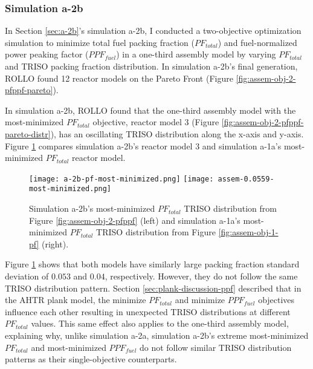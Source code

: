 \subsubsection{Simulation a-2b}
In Section \ref{sec:a-2b}'s simulation a-2b, I conducted a two-objective 
optimization simulation to minimize total fuel packing fraction ($PF_{total}$) and 
fuel-normalized power peaking factor ($PPF_{fuel}$) in a one-third assembly model 
by varying $PF_{total}$ and TRISO packing fraction distribution. 
In simulation a-2b's final generation, ROLLO found 12 reactor models on the Pareto Front 
(Figure \ref{fig:assem-obj-2-pfppf-pareto}). 

In simulation a-2b, \gls{ROLLO} found that the one-third assembly model with the 
most-minimized $PF_{total}$ objective, reactor model 3 (Figure 
\ref{fig:assem-obj-2-pfppf-pareto-distr}), has an oscillating TRISO distribution 
along the x-axis and y-axis. 
Figure \ref{fig:a-2b-pf-triso-comparison} compares simulation a-2b's reactor model 3 and 
simulation a-1a's most-minimized $PF_{total}$ reactor model. 
\begin{figure}[htbp!]
    \centering
    \texttt{[image: a-2b-pf-most-minimized.png]} 
    \texttt{[image: assem-0.0559-most-minimized.png]} 
    \caption{Simulation a-2b's most-minimized $PF_{total}$ TRISO distribution 
    from Figure \ref{fig:assem-obj-2-pfppf} (left) and simulation a-1a's 
    most-minimized $PF_{total}$ TRISO distribution from Figure 
    \ref{fig:assem-obj-1-pf} (right).}
    \label{fig:a-2b-pf-triso-comparison}
\end{figure}
Figure \ref{fig:a-2b-pf-triso-comparison} shows that both models have similarly large 
packing fraction standard deviation of $0.053$ and $0.04$, respectively. 
However, they do not follow the same TRISO distribution pattern. 
Section \ref{sec:plank-discussion-ppf} described that in the \gls{AHTR} plank model, 
the minimize $PF_{total}$ and minimize $PPF_{fuel}$ objectives influence each other
resulting in unexpected TRISO distributions at different $PF_{total}$ values.
This same effect also applies to the one-third assembly model, explaining why, unlike 
simulation a-2a, simulation a-2b's extreme most-minimized $PF_{total}$ and 
most-minimized $PPF_{fuel}$ do not follow similar TRISO distribution patterns as their 
single-objective counterparts.

